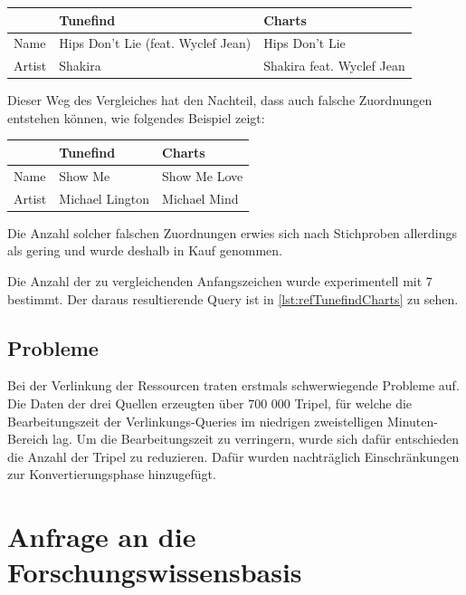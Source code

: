 \documentclass[parskip]{scrartcl}
\begin{document}
\begin{tabular}{p{}|p{}|p{}}
     & \textbf{Tunefind} & \textbf{Charts} \\\hline
    Name & Hips Don't Lie (feat. Wyclef Jean)  & Hips Don't Lie\\
    Artist & Shakira & Shakira feat. Wyclef Jean\\
\end{tabular}

Dieser Weg des Vergleiches hat den Nachteil, dass auch falsche Zuordnungen entstehen können, wie folgendes Beispiel zeigt:

\begin{tabular}{p{}|p{}|p{}}
    & \textbf{Tunefind} & \textbf{Charts} \\\hline
    Name & Show Me  & Show Me Love\\
    Artist & Michael Lington & Michael Mind\\
\end{tabular}

Die Anzahl solcher falschen Zuordnungen erwies sich nach Stichproben allerdings als gering und wurde deshalb in Kauf genommen.

Die Anzahl der zu vergleichenden Anfangszeichen wurde experimentell mit 7 bestimmt. Der daraus resultierende Query ist in \autoref{lst:refTunefindCharts} zu sehen.



\subsection{Probleme}
\label{subsec:problems}

Bei der Verlinkung der Ressourcen traten erstmals schwerwiegende Probleme auf. Die Daten der drei Quellen erzeugten über 700 000 Tripel, für welche die Bearbeitungszeit der Verlinkungs-Queries im niedrigen zweistelligen  Minuten-Bereich lag. Um die Bearbeitungszeit zu verringern, wurde sich dafür entschieden die Anzahl der Tripel zu reduzieren. Dafür wurden nachträglich Einschränkungen zur Konvertierungsphase hinzugefügt.

\section{Anfrage an die Forschungswissensbasis}
\end{document}

